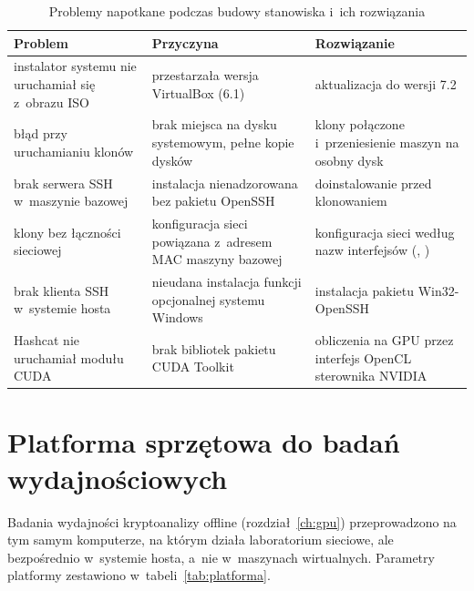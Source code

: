 \begin{table}[htbp]
\centering\small
\begin{tabularx}{\textwidth}{@{}>{\raggedright\arraybackslash}p{4.1cm}>{\raggedright\arraybackslash}p{4.6cm}L@{}}
\toprule
\textbf{Problem} & \textbf{Przyczyna} & \textbf{Rozwiązanie} \\
\midrule
instalator systemu nie uruchamiał się z~obrazu ISO & przestarzała wersja VirtualBox (6.1) & aktualizacja do wersji 7.2 \\
błąd  przy uruchamianiu klonów & brak miejsca na dysku systemowym, pełne kopie dysków & klony połączone i~przeniesienie maszyn na osobny dysk \\
brak serwera SSH w~maszynie bazowej & instalacja nienadzorowana bez pakietu OpenSSH & doinstalowanie  przed klonowaniem \\
klony bez łączności sieciowej & konfiguracja sieci powiązana z~adresem MAC maszyny bazowej & konfiguracja sieci według nazw interfejsów (, ) \\
brak klienta SSH w~systemie hosta & nieudana instalacja funkcji opcjonalnej systemu Windows & instalacja pakietu Win32-OpenSSH \\
Hashcat nie uruchamiał modułu CUDA & brak bibliotek pakietu CUDA Toolkit & obliczenia na GPU przez interfejs OpenCL sterownika NVIDIA \\
\bottomrule
\end{tabularx}
\caption{Problemy napotkane podczas budowy stanowiska i~ich rozwiązania}
\label{tab:problemy}
\end{table}

\section{Platforma sprzętowa do badań wydajnościowych}\label{sec:platforma}

Badania wydajności kryptoanalizy offline (rozdział~\ref{ch:gpu}) przeprowadzono na tym samym komputerze, na którym działa laboratorium sieciowe, ale bezpośrednio w~systemie hosta, a~nie w~maszynach wirtualnych. Parametry platformy zestawiono w~tabeli~\ref{tab:platforma}.

